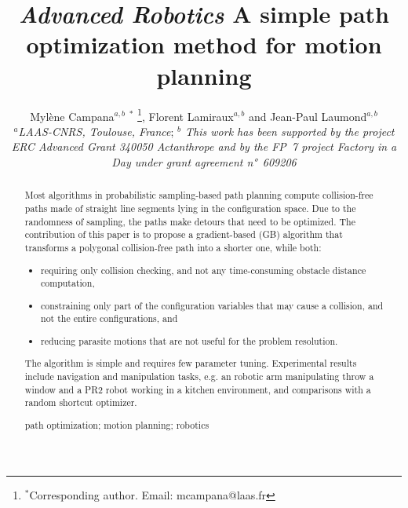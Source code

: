 \documentclass{tADR2e}
\begin{document}
\graphicspath{{images/}}

   

\title{{\itshape Advanced Robotics} A simple path optimization method for motion planning }	

\author{Myl\`{e}ne Campana$^{a,b}$ $^{\ast}$ \thanks{$^\ast$Corresponding author. Email: mcampana@laas.fr}, Florent Lamiraux$^{a,b}$ and Jean-Paul Laumond$^{a,b}$
\\\vspace{6pt}
$^{a}${\em{LAAS-CNRS, Toulouse, France}};
$^{b}${\em{ This work has been supported by the project ERC Advanced Grant 340050 Actanthrope and by the FP~7 project Factory in a Day under grant agreement n°~609206 }}
}
\maketitle

\begin{abstract}
Most algorithms in probabilistic sampling-based path planning compute 
collision-free paths made of straight line segments lying in the configuration 
space. Due
to the randomness of sampling, the paths make detours that need to be optimized.
The contribution of this paper is to propose a gradient-based (GB) algorithm that
transforms a polygonal collision-free path into a shorter one, while both:
\begin{itemize}
\item requiring only collision checking, and not any time-consuming obstacle distance computation,
\item constraining only part of the configuration variables that may cause a 
collision, and not the entire configurations, and
\item reducing parasite motions that are not useful for the problem resolution.
\end{itemize}
The algorithm is simple and requires few parameter tuning. Experimental
results include navigation and manipulation tasks, e.g. an robotic arm 
manipulating throw a window and a PR2 robot working in a kitchen environment, 
and comparisons with a random shortcut optimizer.

\medskip

\begin{keywords}path optimization; motion planning; robotics
\end{keywords}\medskip

\end{abstract}
\end{document}
